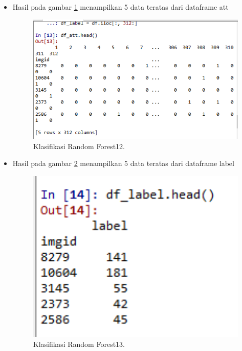 \begin{enumerate}
\begin{itemize}
\item Hasil pada gambar \ref{rons12} menampilkan 5 data teratas dari dataframe att
 		\begin{figure}[ht]
		\centerline{\includegraphics[width=1\textwidth]{figures/im/rons12.png}}
		\caption{Klasifikasi Random Forest12.}
		\label{rons12}
		\end{figure}

\item Hasil pada gambar \ref{rons13} menampilkan 5 data teratas dari dataframe label
 		\begin{figure}[ht]
		\centerline{\includegraphics[width=1\textwidth]{figures/im/rons13.png}}
		\caption{Klasifikasi Random Forest13.}
		\label{rons13}
		\end{figure}


\end{itemize}
\end{enumerate}

